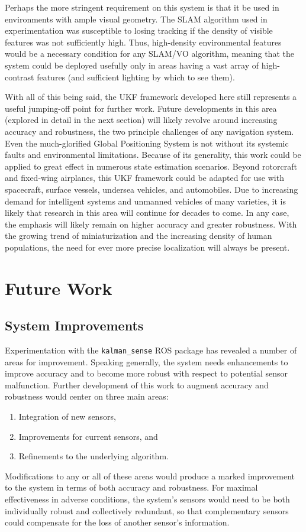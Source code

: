 Perhaps the more stringent requirement on this system is that it be used in environments with ample visual geometry. The SLAM algorithm used in experimentation was susceptible to losing tracking if the density of visible features was not sufficiently high. Thus, high-density environmental features would be a necessary condition for any SLAM/VO algorithm, meaning that the system could be deployed usefully only in areas having a vast array of high-contrast features (and sufficient lighting by which to see them).

With all of this being said, the UKF framework developed here still represents a useful jumping-off point for further work. Future developments in this area (explored in detail in the next section) will likely revolve around increasing accuracy and robustness, the two principle challenges of any navigation system. Even the much-glorified Global Positioning System is not without its systemic faults and environmental limitations. Because of its generality, this work could be applied to great effect in numerous state estimation scenarios. Beyond rotorcraft and fixed-wing airplanes, this UKF framework could be adapted for use with spacecraft, surface vessels, undersea vehicles, and automobiles. Due to increasing demand for intelligent systems and unmanned vehicles of many varieties, it is likely that research in this area will continue for decades to come. In any case, the emphasis will likely remain on higher accuracy and greater robustness. With the growing trend of miniaturization and the increasing density of human populations, the need for ever more precise localization will always be present.

\section{Future Work}

\subsection{System Improvements}

Experimentation with the \texttt{kalman\_sense} ROS package has revealed a number of areas for improvement. Speaking generally, the system needs enhancements to improve accuracy and to become more robust with respect to potential sensor malfunction. Further development of this work to augment accuracy and robustness would center on three main areas:
\begin{enumerate}
    \item Integration of new sensors,
    \item Improvements for current sensors, and
    \item Refinements to the underlying algorithm.
\end{enumerate}
Modifications to any or all of these areas would produce a marked improvement to the system in terms of both accuracy and robustness. For maximal effectiveness in adverse conditions, the system's sensors would need to be both individually robust and collectively redundant, so that complementary sensors could compensate for the loss of another sensor's information.

